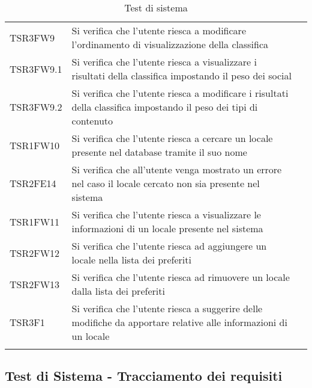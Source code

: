 \begin{longtable}{ m{}<{\centering}  m{}<{\centering}  m{}<{\centering} }
	TSR3FW9 & Si verifica che l'utente riesca a modificare l'ordinamento di visualizzazione della classifica & \Ni \\
	TSR3FW9.1 & Si verifica che l'utente riesca a visualizzare i risultati della classifica impostando il peso dei social & \Ni \\
	TSR3FW9.2 & Si verifica che l'utente riesca a modificare i risultati della classifica impostando il peso dei tipi di contenuto & \Ni \\
	TSR1FW10 & Si verifica che l'utente riesca a cercare un locale presente nel database tramite il suo nome & \Ni \\
	TSR2FE14 & Si verifica che all'utente venga mostrato un errore nel caso il locale cercato non sia presente nel sistema & \Ni \\
	TSR1FW11 & Si verifica che l'utente riesca a visualizzare le informazioni di un locale presente nel sistema & \Ni \\
	TSR2FW12 & Si verifica che l'utente riesca ad aggiungere un locale nella lista dei preferiti & \Ni \\
	TSR2FW13 & Si verifica che l'utente riesca ad rimuovere un locale dalla lista dei preferiti & \Ni \\
	TSR3F1 & Si verifica che l'utente riesca a suggerire delle modifiche da apportare relative alle informazioni di un locale & \Ni \\
	
    \caption{Test di sistema}
\end{longtable}	

\subsection{Test di Sistema - Tracciamento dei requisiti}



